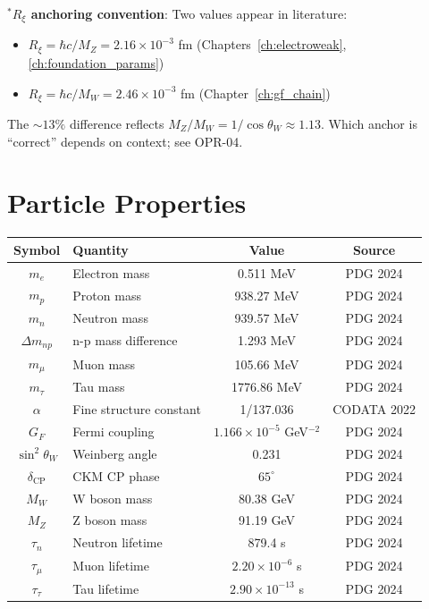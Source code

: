 \noindent$^*$\textbf{$R_\xi$ anchoring convention}: Two values appear in literature:
\begin{itemize}[nosep]
\item $R_\xi = \hbar c/M_Z = 2.16 \times 10^{-3}$ fm (Chapters~\ref{ch:electroweak}, \ref{ch:foundation_params}) \tagBL{}
\item $R_\xi = \hbar c/M_W = 2.46 \times 10^{-3}$ fm (Chapter~\ref{ch:gf_chain}) \tagI{}
\end{itemize}
The $\sim 13\%$ difference reflects $M_Z/M_W = 1/\cos\theta_W \approx 1.13$.
Which anchor is ``correct'' depends on context; see OPR-04.

\section{Particle Properties}

\begin{center}
\begin{tabular}{clcc}
\toprule
\textbf{Symbol} & \textbf{Quantity} & \textbf{Value} & \textbf{Source} \\
\midrule
$m_e$ & Electron mass & 0.511 MeV & PDG 2024 \\
$m_p$ & Proton mass & 938.27 MeV & PDG 2024 \\
$m_n$ & Neutron mass & 939.57 MeV & PDG 2024 \\
$\Delta m_{np}$ & n-p mass difference & 1.293 MeV & PDG 2024 \\
$m_\mu$ & Muon mass & 105.66 MeV & PDG 2024 \\
$m_\tau$ & Tau mass & 1776.86 MeV & PDG 2024 \\
\midrule
$\alpha$ & Fine structure constant & 1/137.036 & CODATA 2022 \\
$G_F$ & Fermi coupling & $1.166 \times 10^{-5}$ GeV$^{-2}$ & PDG 2024 \\
$\sin^2\theta_W$ & Weinberg angle & 0.231 & PDG 2024 \\
$\delta_{\text{CP}}$ & CKM CP phase & $65^\circ$ & PDG 2024 \\
$M_W$ & W boson mass & 80.38 GeV & PDG 2024 \\
$M_Z$ & Z boson mass & 91.19 GeV & PDG 2024 \\
\midrule
$\tau_n$ & Neutron lifetime & 879.4 s & PDG 2024 \\
$\tau_\mu$ & Muon lifetime & $2.20 \times 10^{-6}$ s & PDG 2024 \\
$\tau_\tau$ & Tau lifetime & $2.90 \times 10^{-13}$ s & PDG 2024 \\
\bottomrule
\end{tabular}
\end{center}

